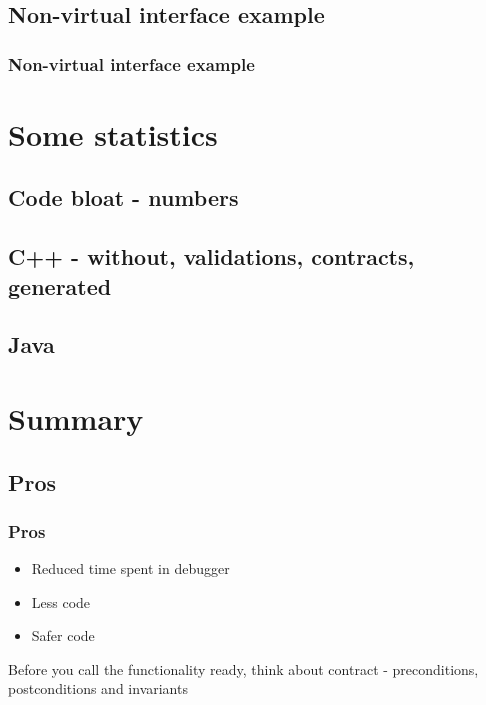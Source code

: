 \documentclass{beamer}
\begin{document}
\subsection{Non-virtual interface example}
\begin{frame}[fragile]
\frametitle{Non-virtual interface example}
\end{frame}




\section{Some statistics} %
\subsection{Code bloat - numbers}
\subsection{C++ - without, validations, contracts, generated}
\subsection{Java}

\section{Summary}
\subsection{Pros}
\begin{frame}
\frametitle{Pros}
\begin{itemize}
  \item Reduced time spent in debugger
  \item Less code
  \item Safer code
\end{itemize}
Before you call the functionality ready, think about contract - preconditions, postconditions and invariants
\end{frame}
\end{document}
